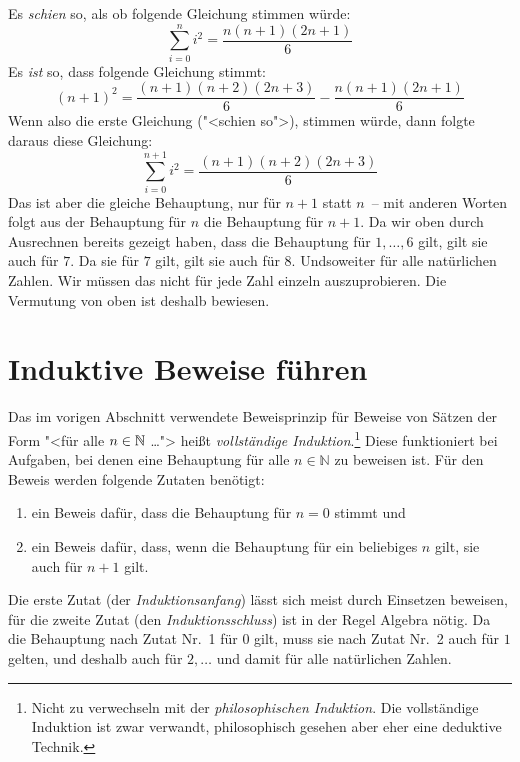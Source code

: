 Es \emph{schien} so, als ob folgende Gleichung stimmen würde:
%
\begin{displaymath}
  \sum_{i=0}^n i^2 = \dfrac{n(n+1)(2n+1)}{6}
\end{displaymath}
%
Es \emph{ist} so, dass folgende Gleichung stimmt:
%
\[ (n+1)^2 = \dfrac{(n+1)(n+2)(2n+3)}{6} - \dfrac{n(n+1)(2n+1)}{6}\]
%
Wenn also die erste Gleichung ("<schien so">), stimmen würde, dann folgte
daraus diese Gleichung:
%
\begin{displaymath}
  \sum_{i=0}^{n+1} i^2 = \dfrac{(n+1)(n+2)(2n+3)}{6}
\end{displaymath}
%
Das ist aber die gleiche Behauptung, nur für $n+1$ statt $n$~-- mit
anderen Worten folgt aus der Behauptung für $n$ die Behauptung für
$n+1$.  Da wir oben durch Ausrechnen bereits gezeigt haben, dass die
Behauptung für $1,\ldots,6$ gilt, gilt sie auch für $7$.  Da sie für
$7$ gilt, gilt sie auch für $8$.  Undsoweiter für alle natürlichen
Zahlen.  Wir müssen das nicht für jede Zahl einzeln auszuprobieren.  Die Vermutung
von oben ist deshalb bewiesen.

\section{Induktive Beweise führen}
\label{sec:nat-induction-ka}
\label{page:mathematical-induction}
Das im vorigen Abschnitt verwendete Beweisprinzip für Beweise 
von Sätzen der Form "<für alle $n\in\mathbb{N}$ \ldots">
heißt
\textit{vollständige Induktion}.\footnote{Nicht zu
verwechseln mit der \textit{philosophischen Induktion}.  Die
vollständige Induktion ist zwar verwandt, philosophisch gesehen aber
eher eine deduktive Technik.}  Diese
funktioniert bei Aufgaben, bei denen eine Behauptung für alle
$n\in\mathbb{N}$ zu beweisen ist.  Für den Beweis werden folgende
Zutaten benötigt:
%
\begin{enumerate}
\item ein Beweis dafür, dass die Behauptung für $n=0$ stimmt und
\item ein Beweis dafür, dass, wenn die Behauptung für ein beliebiges
  $n$ gilt, sie auch für $n+1$ gilt.
\end{enumerate}
%
Die erste Zutat (der
\textit{Induktionsanfang}) lässt sich meist
durch Einsetzen beweisen, für die zweite Zutat (den
\textit{Induktionsschluss}) ist in der Regel Algebra
nötig.  Da die Behauptung nach Zutat Nr.~1 für $0$ gilt, muss sie nach
Zutat Nr.~2 auch für $1$ gelten, und deshalb auch für $2,\ldots$ und
damit für alle natürlichen Zahlen.

